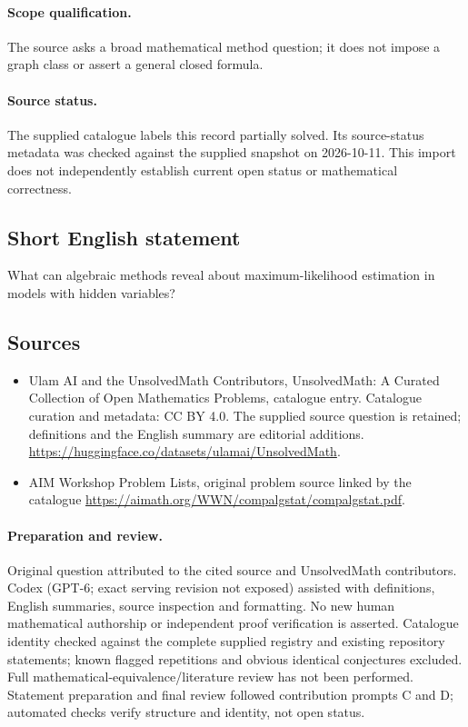 \documentclass[11pt]{article}
\begin{document}
\paragraph{Scope qualification.}
The source asks a broad mathematical method question; it does not impose a graph class or assert a general closed formula.
\paragraph{Source status.}
The supplied catalogue labels this record partially solved. Its source-status metadata was checked against the supplied snapshot on 2026-10-11. This import does not independently establish current open status or mathematical correctness.
\subsection{Short English statement}
What can algebraic methods reveal about maximum-likelihood estimation in models with hidden variables?
\subsection{Sources}
\begin{itemize}
\item[S1] Ulam AI and the UnsolvedMath Contributors, UnsolvedMath: A Curated Collection of Open Mathematics Problems, catalogue entry. Catalogue curation and metadata: CC BY 4.0. The supplied source question is retained; definitions and the English summary are editorial additions.
\url{https://huggingface.co/datasets/ulamai/UnsolvedMath}.
\item[S2] AIM Workshop Problem Lists, original problem source linked by the catalogue
\url{https://aimath.org/WWN/compalgstat/compalgstat.pdf}.
\end{itemize}
\paragraph{Preparation and review.}
Original question attributed to the cited source and UnsolvedMath contributors. Codex (GPT-6; exact serving revision not exposed) assisted with definitions, English summaries, source inspection and formatting. No new human mathematical authorship or independent proof verification is asserted. Catalogue identity checked against the complete supplied registry and existing repository statements; known flagged repetitions and obvious identical conjectures excluded. Full mathematical-equivalence/literature review has not been performed. Statement preparation and final review followed contribution prompts C and D; automated checks verify structure and identity, not open status.
\label{end:statement}
\end{document}
